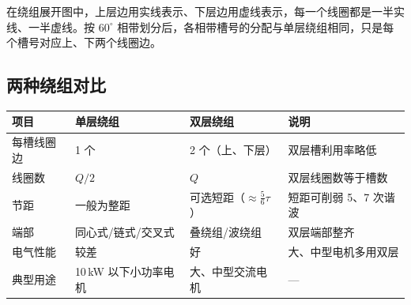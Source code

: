 在绕组展开图中，上层边用实线表示、下层边用虚线表示，每一个线圈都是一半实线、一半虚线。按 $60^\circ$ 相带划分后，各相带槽号的分配与单层绕组相同，只是每个槽号对应上、下两个线圈边。

\subsection{两种绕组对比}
\begin{center}
\begin{tabular}{@{}p{2.2cm}p{3.6cm}p{3.9cm}p{3.0cm}@{}}
\toprule
项目 & 单层绕组 & 双层绕组 & 说明 \\
\midrule
每槽线圈边 & 1 个 & 2 个（上、下层） & 双层槽利用率略低 \\
线圈数 & $Q/2$ & $Q$ & 双层线圈数等于槽数 \\
节距 & 一般为整距 & 可选短距（$\approx\tfrac56\tau$） & 短距可削弱 5、7 次谐波 \\
端部 & 同心式/链式/交叉式 & 叠绕组/波绕组 & 双层端部整齐 \\
电气性能 & 较差 & 好 & 大、中型电机多用双层 \\
典型用途 & 10\,kW 以下小功率电机 & 大、中型交流电机 & — \\
\bottomrule
\end{tabular}
\end{center}


